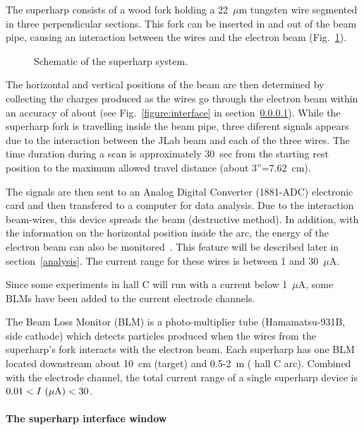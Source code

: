 The superharp consists of a wood fork holding a 22~$\mu$m tungsten wire segmented in three
perpendicular sections. This fork can be inserted in and out of the beam pipe, causing an
interaction between the wires and the electron beam (Fig.~\ref{figure:superharp}).


\begin{figure}[!hbt]
\begin{center}
\caption{Schematic of the superharp system.}
\label{figure:superharp}
\end{center}
\end{figure}

The horizontal and vertical positions of the beam are then determined by collecting the charges
produced as the wires go through the electron beam within an accuracy of about 
(see Fig.~\ref{figure:interface} in section~\ref{interface}). While the superharp fork
is travelling inside the beam pipe, three diferent signals appears due to the interaction
between the JLab beam and each of the three wires. The time duration during a scan is
approximately 30~sec from the starting rest position to the maximum allowed travel distance
(about 3''=7.62~cm).

The signals are then sent to an Analog Digital Converter (1881-ADC) electronic card and then transfered
to a computer for data analysis. Due to the interaction beam-wires, this device spreads the beam
(destructive method). In addition, with the information on the horizontal position inside the arc, the
energy of the electron beam can also be monitored~\cite{Gueye-98-energy}. This feature will be described
later in section~\ref{analysis}. The current range for these wires is
between 1 and 30~$\mu$A.  

Since some experiments in hall C will run with a current below
1~$\mu$A,  some BLMs have been added to the
current electrode channels.

The Beam Loss Monitor (BLM) is a photo-multiplier tube (Hamamatsu-931B, side cathode) which detects
particles produced when the wires from the superharp's fork interacts
with the  electron beam. Each
superharp has one BLM located downstream about 10~cm (target) and
0.5-2~m ( hall C arc). Combined with
the electrode channel, the total current range of a single superharp device is
$0.01 < I~(\mu {\rm A}) < 30$.

\paragraph{The superharp interface window}\label{interface}

